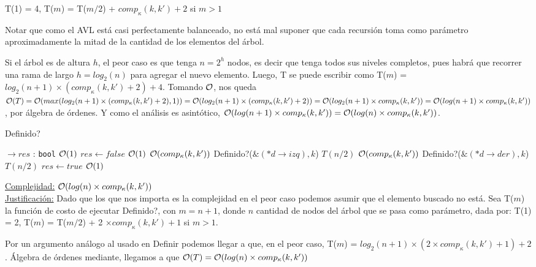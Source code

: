 \begin{Algoritmos}
\begin{algorithm}
T(1) = 4, T($m$) = T($m/2$) + $comp_{\kappa}(k, k') + 2$ si $m > 1$

Notar que como el AVL está casi perfectamente balanceado, no está mal suponer que cada recursión toma como parámetro aproximadamente la mitad de la cantidad de los elementos del árbol.

Si el árbol es de altura $h$, el peor caso es que tenga $n = 2^{h}$ nodos, es decir que tenga todos sus niveles completos, pues habrá que recorrer una rama de largo $h = log_2(n)$ para agregar el nuevo elemento. Luego, T se puede escribir como T($m$) = $log_2(n + 1) \times (comp_{\kappa}(k, k') + 2) + 4$. Tomando $\mathcal{O}$, nos queda $\mathcal{O}(T) = \mathcal{O}(max(log_2(n + 1) \times (comp_{\kappa}(k, k') + 2), 1)) = \mathcal{O}(log_2(n + 1) \times (comp_{\kappa}(k, k') + 2)) = \mathcal{O}(log_2(n + 1) \times comp_{\kappa}(k, k')) = \mathcal{O}(log(n + 1) \times comp_{\kappa}(k, k'))$, por álgebra de órdenes. Y como el análisis es asintótico, $\mathcal{O}(log(n + 1) \times comp_{\kappa}(k, k')) = \mathcal{O}(log(n) \times comp_{\kappa}(k, k'))$.

\end{algorithm}

\begin{algorithm}
\caption{Definido?}
\begin{algorithmic}[1]
$\to res$ : \texttt{bool}
	\Comment $\mathcal{O}(1)$
	 \State $res\gets false$
	 \Comment $\mathcal{O}(1)$
	 \Else	
			\Comment $\mathcal{O}(comp_{\kappa}(k, k'))$
				\State Definido?($\&(*d\to izq), k$)	
				\Comment $T(n/2)$	
			\Else
				\Comment $\mathcal{O}(comp_{\kappa}(k, k'))$
					\State Definido?($\&(*d\to der), k$)
					\Comment $T(n/2)$
				\Else
					\State $res\gets true$
					\Comment $\mathcal{O}(1)$	
				\EndIf
			\EndIf
	\EndIf
\EndProcedure
\end{algorithmic}
\underline{Complejidad:} $\mathcal{O}(log(n)  \times comp_{\kappa}(k, k'))$ \\
\underline{Justificación:} Dado que los que nos importa es la complejidad en el peor caso podemos asumir que el elemento buscado no está. Sea T($m$) la función de costo de ejecutar Definido?, con $m = n + 1$, donde $n$ cantidad de nodos del árbol que se pasa como parámetro, dada por: T(1) = 2, T($m$) = T($m/2$) + 2 $\times comp_{\kappa}(k, k') + 1$ si $m > 1$.

Por un argumento análogo al usado en Definir podemos llegar a que, en el peor caso, T($m$) = $log_2(n + 1) \times (2 \times comp_{\kappa}(k, k') + 1) + 2$. Álgebra de órdenes mediante, llegamos a que $\mathcal{O}(T) = \mathcal{O}(log(n) \times comp_{\kappa}(k, k'))$
\end{algorithm}


\end{Algoritmos}
